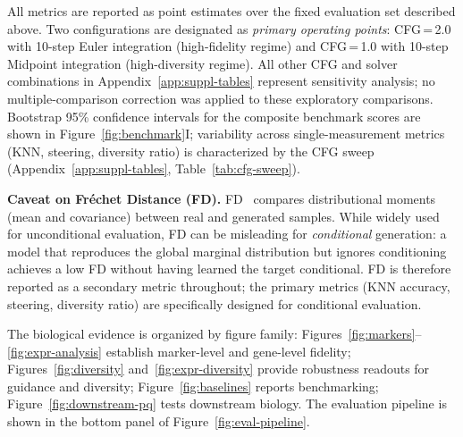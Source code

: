 \documentclass[11pt,a4paper]{article}
\begin{document}
All metrics are reported as point estimates over the fixed evaluation set described above. Two configurations are designated as \emph{primary operating points}: CFG\,=\,2.0 with 10-step Euler integration (high-fidelity regime) and CFG\,=\,1.0 with 10-step Midpoint integration (high-diversity regime). All other CFG and solver combinations in Appendix~\ref{app:suppl-tables} represent sensitivity analysis; no multiple-comparison correction was applied to these exploratory comparisons. Bootstrap 95\% confidence intervals for the composite benchmark scores are shown in Figure~\ref{fig:benchmark}I; variability across single-measurement metrics (KNN, steering, diversity ratio) is characterized by the CFG sweep (Appendix~\ref{app:suppl-tables}, Table~\ref{tab:cfg-sweep}).

\textbf{Caveat on Fr\'{e}chet Distance (FD).} FD~\cite{ref-fid} compares distributional moments (mean and covariance) between real and generated samples. While widely used for unconditional evaluation, FD can be misleading for \emph{conditional} generation: a model that reproduces the global marginal distribution but ignores conditioning achieves a low FD without having learned the target conditional. FD is therefore reported as a secondary metric throughout; the primary metrics (KNN accuracy, steering, diversity ratio) are specifically designed for conditional evaluation.

The biological evidence is organized by figure family: Figures~\ref{fig:markers}--\ref{fig:expr-analysis} establish marker-level and gene-level fidelity; Figures~\ref{fig:diversity} and~\ref{fig:expr-diversity} provide robustness readouts for guidance and diversity; Figure~\ref{fig:baselines} reports benchmarking; Figure~\ref{fig:downstream-pq} tests downstream biology. The evaluation pipeline is shown in the bottom panel of Figure~\ref{fig:eval-pipeline}.
\end{document}

